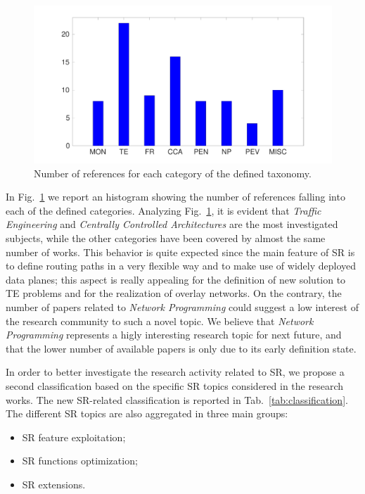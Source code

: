 \begin{figure}
    \centering
    \includegraphics[trim=4cm 1.2cm 4cm 1cm,clip, width=1\columnwidth]{fig/taxonomy1-new.pdf}
    \caption{Number of references for each category of the defined taxonomy.}
    \label{fig:taxonomy1}
\end{figure}

In Fig.~\ref{fig:taxonomy1} we report an histogram showing the number of references falling into each of the defined categories.
Analyzing Fig.~\ref{fig:taxonomy1}, it is evident that \emph{Traffic Engineering} and \emph{Centrally Controlled Architectures} are the most investigated subjects, while the other categories have been covered by almost the same number of works.
This behavior is quite expected since the main feature of SR is to define routing paths in a very flexible way and to make use of widely deployed data planes; this aspect is really appealing for the definition of new solution to TE problems and for the realization of overlay networks.
On the contrary, the number of papers related to \emph{Network Programming} could suggest a low interest of the research community to such a novel topic. We believe that \emph{Network Programming} represents a higly interesting research topic for next future, and that the lower number of available papers is only due to its early definition state.

In order to better investigate the research activity related to SR, we propose a second classification based on the specific SR topics considered in the research works. The new SR-related classification is reported in Tab.~\ref{tab:classification}. The different SR topics are also aggregated in three main groups:
\begin{itemize}
    \item SR feature exploitation;
    \item SR functions optimization;
    \item SR extensions.
\end{itemize}

